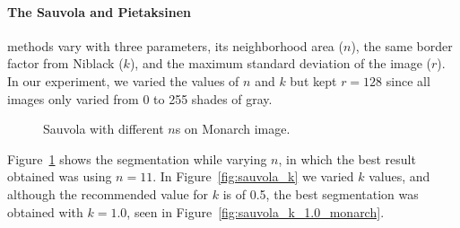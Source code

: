 \documentclass[conference]{IEEEtran}
\begin{document}
\paragraph*{The Sauvola and Pietaksinen} methods vary with three parameters, its neighborhood area ($n$), the same border factor from Niblack ($k$), and the maximum standard deviation of the image ($r$). In our experiment, we varied the values of $n$ and $k$ but kept $r = 128$ since all images only varied from 0 to 255 shades of gray.
\begin{figure}[htbp]
	\centering
	\quad
	\caption{Sauvola with different $n$s on Monarch image.}
	\label{fig:sauvola_n}
\end{figure}
Figure~\ref{fig:sauvola_n} shows the segmentation while varying $n$, in which the best result obtained was using $n = 11$. In Figure~\ref{fig:sauvola_k} we varied $k$ values, and although the recommended value for $k$ is of 0.5, the best segmentation was obtained with $k = 1.0$, seen in Figure~\ref{fig:sauvola_k_1.0_monarch}.
\end{document}
